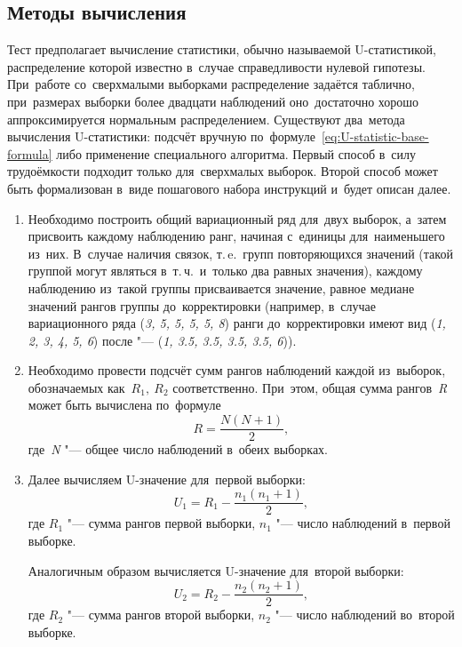 \documentclass[]{scrreprt}
\begin{document}
\subsection{Методы вычисления}
Тест предполагает вычисление статистики, обычно называемой U-статистикой, распределение которой известно в~случае справедливости нулевой гипотезы. При~работе со~сверхмалыми выборками распределение задаётся таблично, при~размерах выборки более двадцати наблюдений оно~достаточно хорошо аппроксимируется нормальным распределением. Существуют два~метода вычисления U-статистики: подсчёт вручную по~формуле~\ref{eq:U-statistic-base-formula} либо применение специального алгоритма. Первый способ в~силу трудоёмкости подходит только для~сверхмалых выборок. Второй способ может быть формализован в~виде пошагового набора инструкций и~будет описан далее.
\begin{enumerate}
	\item Необходимо построить общий вариационный ряд для~двух выборок, а~затем присвоить каждому наблюдению ранг, начиная с~единицы для~наименьшего из~них. В~случае наличия связок, т.\,e.~групп повторяющихся значений (такой группой могут являться в~т.\,ч.~и~только два равных значения), каждому наблюдению из~такой группы присваивается значение, равное медиане значений рангов группы до~корректировки (например, в~случае вариационного ряда (\textit{3, 5, 5, 5, 5, 8}) ранги до~корректировки имеют вид (\textit{1, 2, 3, 4, 5, 6}) после "--- (\textit{1, 3.5, 3.5, 3.5, 3.5, 6})).
	\item Необходимо провести подсчёт сумм рангов наблюдений каждой из~выборок, обозначаемых как~${\textstyle R_{1},\ R_{2}}$ соответственно. При~этом, общая сумма рангов~\textit{R} может быть вычислена по~формуле
	\begin{equation}\label{eq:common-R}
	R = \frac{N(N+1)}{2},
	\end{equation}
	где~\textit{N} "--- общее число наблюдений в~обеих выборках.
	\item Далее вычисляем U-значение для~первой выборки:
	\begin{equation}\label{eq:U1}
	U_{1}=R_{1}-\frac{n_{1}(n_{1}+1)}{2},
	\end{equation}
	где ${\textstyle R_{1}}$ "--- сумма рангов первой выборки, ${\textstyle n_{1}}$ "--- число наблюдений в~первой выборке.
	
	Аналогичным образом вычисляется U-значение для~второй выборки:
	\begin{equation}\label{eq:U2}
	U_{2}=R_{2}-\frac{n_{2}(n_{2}+1)}{2},
	\end{equation}
	где ${\textstyle R_{2}}$ "--- сумма рангов второй выборки, ${\textstyle n_{2}}$ "--- число наблюдений во~второй выборке.
	

\end{enumerate}
\end{document}

